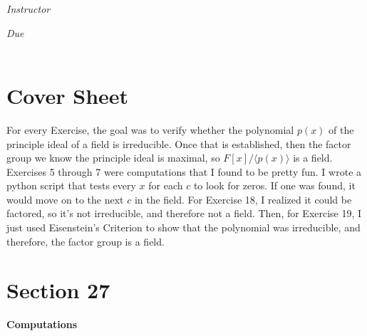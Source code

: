 \documentclass[12pt, oneside]{book}
\newcommand{\gen}[1]{\langle #1 \rangle}
\begin{document}
\begin{titlepage}
\begin{center}
\begin{large}
            \vspace*{1\baselineskip}

            \textit{Instructor} \\[1ex] %
            \professor

            \vspace*{1\baselineskip}

            \textit{Due}\\[1ex]
            {\scshape  \finaldate} \\[0.3\baselineskip] %

            \thispagestyle{empty}

        \end{large}
    \end{center}
\end{titlepage}


\section*{Cover Sheet}

For every Exercise, the goal was to verify whether the polynomial \(p(x)\) of the principle ideal of a field is irreducible. Once that is established, then the factor group we know the principle ideal is maximal, so \(F[x]/\gen{p(x)}\) is a field. Exercises 5 through 7 were computations that I found to be pretty fun. I wrote a python script that tests every \(x\) for each \(c\) to look for zeros. If one was found, it would move on to the next \(c\) in the field. For Exercise 18, I realized it could be factored, so it's not irreducible, and therefore not a field. Then, for Exercise 19, I just used Eisenstein's Criterion to show that the polynomial was irreducible, and therefore, the factor group is a field. 

\newpage

\section*{Section 27}

\textbf{Computations}
\end{document}
